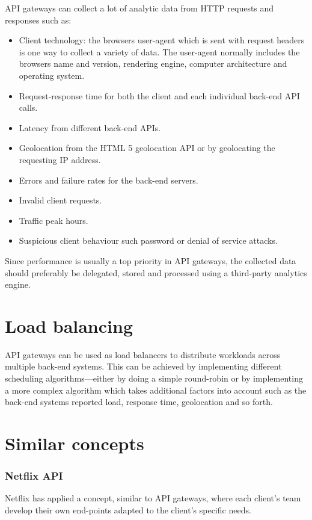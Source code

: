 \documentclass{cslthse-msc}
\begin{document}
\vspace{5mm}

\noindent API gateways can collect a lot of analytic data from HTTP requests and responses such as:
\begin{itemize}
	\item Client technology: the browsers user-agent which is sent with request headers is one way to collect a variety of data. The user-agent normally includes the browsers name and version, rendering engine, computer architecture and operating system.
	\item Request-response time for both the client and each individual back-end API calls.
	\item Latency from different back-end APIs.
	\item Geolocation from the HTML 5 geolocation API \cite{html5_geolocation} or by geolocating the requesting IP address.
	\item Errors and failure rates for the back-end servers.
	\item Invalid client requests.
	\item Traffic peak hours.
	\item Suspicious client behaviour such password or denial of service attacks.
\end{itemize}

\noindent Since performance is usually a top priority in API gateways, the collected data should preferably be delegated, stored and processed using a third-party analytics engine.

\section{Load balancing}
API gateways can be used as load balancers to distribute workloads across multiple back-end systems. This can be achieved by implementing different scheduling algorithms---either by doing a simple round-robin or by implementing a more complex algorithm which takes additional factors into account such as the back-end systems reported load, response time, geolocation and so forth.

\section{Similar concepts}
\label{similar_concepts}
\subsubsection{Netflix API}
Netflix has applied a concept, similar to API gateways, where each client's team develop their own end-points adapted to the client's specific needs.
\end{document}
